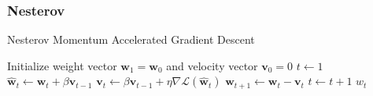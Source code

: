 \subsubsection{Nesterov}

\begin{algorithm}[h!]
	\caption{Nesterov Momentum Accelerated Gradient Descent}
	\label{alg:ngd}
	\begin{algorithmic}[1]
			\State Initialize weight vector $\textbf{w}_1 = \textbf{w}_0$ and velocity vector $\textbf{v}_0 = 0$
			\State $t \gets 1$
				\State $\hat{\textbf{w}}_t \gets \textbf{w}_t + \beta \textbf{v}_{t-1}$
				\State $\textbf{v}_t \gets \beta \textbf{v}_{t-1} + \eta \nabla \mathcal{L}(\hat{\textbf{w}}_t)$
				\State $\textbf{w}_{t+1} \gets \textbf{w}_t - \textbf{v}_t$
				\State $t \gets t + 1$
			\EndWhile
			\State \Return $w_t$
		\EndFunction
	\end{algorithmic}
\end{algorithm}